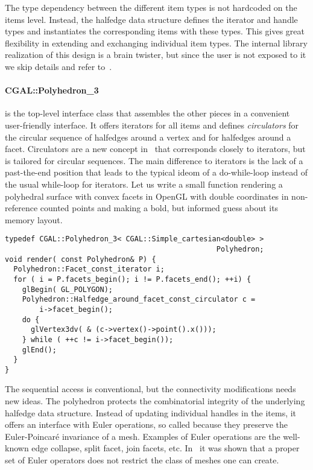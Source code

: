 The type dependency between the different item types is not hardcoded
on the items level. Instead, the halfedge data structure defines the
iterator and handle types and instantiates the corresponding items
with these types. This gives great flexibility in extending and
exchanging individual item types. The internal library
realization of this design is a brain twister, but since the user is
not exposed to it we skip details and refer to~\cite{k-ugpdd-99}.

\paragraph*{CGAL::Polyhedron\_3} is the top-level interface class that
assembles the other pieces in a convenient user-friendly interface.
It offers iterators for all items and defines \emph{circulators} for
the circular sequence of halfedges around a vertex and for halfedges
around a facet. Circulators are a new concept in \cgal\ that
corresponds closely to iterators, but is tailored for circular
sequences.  The main difference to iterators is the lack of a
past-the-end position that leads to the typical ideom of a
do-while-loop instead of the usual while-loop for iterators.  Let us
write a small function rendering a polyhedral surface with convex
facets in OpenGL with double coordinates in non-reference counted
points and making a bold, but informed guess about its memory layout.
%
\begin{lstlisting}
typedef CGAL::Polyhedron_3< CGAL::Simple_cartesian<double> > 
                                                 Polyhedron;
void render( const Polyhedron& P) {
  Polyhedron::Facet_const_iterator i;
  for ( i = P.facets_begin(); i != P.facets_end(); ++i) {
    glBegin( GL_POLYGON);
    Polyhedron::Halfedge_around_facet_const_circulator c = 
        i->facet_begin();
    do {
      glVertex3dv( & (c->vertex()->point().x()));
    } while ( ++c != i->facet_begin());
    glEnd();
  }
}
\end{lstlisting}%
%
The sequential access is conventional, but the connectivity
modifications needs new ideas. The polyhedron protects the
combinatorial integrity of the underlying halfedge data structure.
Instead of updating individual handles in the items, it offers an
interface with Euler operations, so called because they preserve the
Euler-Poincar\'e invariance of a mesh. Examples of Euler operations
are the well-known edge collapse, split facet, join facets, etc.
In~\cite{Maentylae88} it was shown that a proper set of Euler
operators does not restrict the class of meshes one can create.

